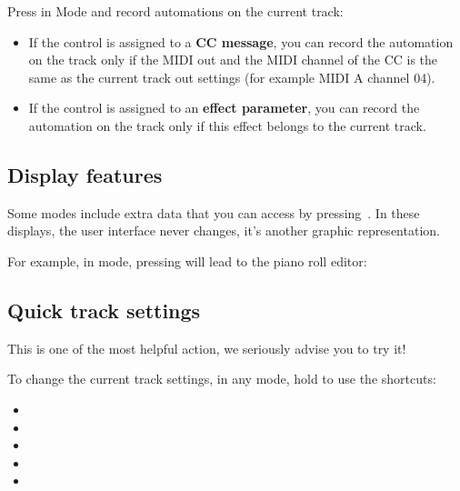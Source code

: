 
Press  in  Mode and record automations on the current track:

\begin{itemize}
\item If the control is assigned to a \textbf{CC message}, you can record the automation on the track only if the MIDI out and the MIDI channel of the CC is the same as the current track out settings (for example MIDI A channel 04).
\item If the control is assigned to an \textbf{effect parameter}, you can record the automation on the track only if this effect belongs to the current track.
\end{itemize}



\subsection{Display features}

Some modes include extra data that you can access by pressing . In these displays, the user interface never changes, it's another graphic representation.

For example, in  mode, pressing  will lead to the piano roll editor:




\subsection{Quick track settings}

This is one of the most helpful action, we seriously advise you to try it!

To change the current track settings, in any mode, hold  to use the shortcuts:

\begin{itemize}
\item {}
\item {}
\item {}
\item {}
\item {}
\end{itemize}

